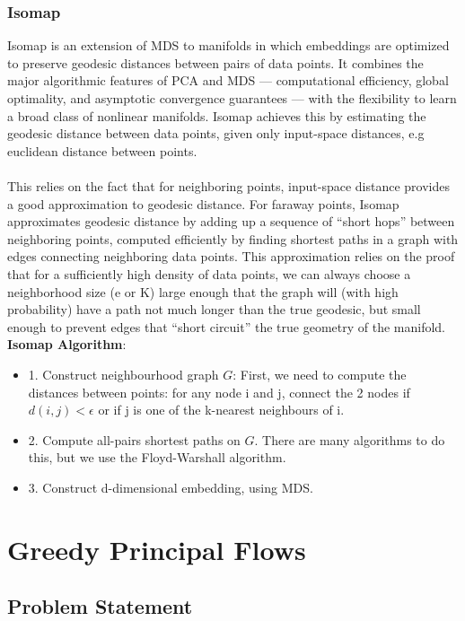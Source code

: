 \documentclass[12pt]{report}
\begin{document}
\newpage

\subsection{Isomap}

Isomap is an extension of MDS to manifolds in which embeddings 
are optimized to preserve geodesic distances between pairs of data points.
It combines the major algorithmic features of PCA and MDS
 — computational efficiency, global optimality, 
 and asymptotic convergence guarantees — 
 with the flexibility to learn a broad class of nonlinear manifolds.
 Isomap achieves this by estimating the geodesic distance between data points, 
 given only input-space distances, e.g euclidean distance between points.\\
\\
This relies on the fact that for neighboring points, 
input-space distance provides a good approximation to geodesic distance. 
For faraway points, Isomap approximates geodesic distance 
by adding up a sequence of “short hops” between neighboring points, 
computed efficiently by finding shortest paths in a graph with edges 
connecting neighboring data points.  
This approximation relies on the proof that for a 
sufficiently high density of data points, 
we can always choose a neighborhood size (e or K) large enough 
that the graph will (with high probability) have a path not much longer 
than the true geodesic, but small enough to prevent edges 
that “short circuit” the true geometry of the manifold.\\
\textbf{Isomap Algorithm}:
\begin{itemize}
    \item 1. Construct neighbourhood graph $G$: 
    First, we need to compute the distances between points: 
    for any node i and j, connect the 2 nodes if 
    $d(i,j) < \epsilon$ or if j is one of the k-nearest neighbours of i.
    \item 2. Compute all-pairs shortest paths on $G$. 
    There are many algorithms to do this, but we use the Floyd-Warshall algorithm.
    \item 3. Construct d-dimensional embedding, using MDS.
\end{itemize}

\chapter{Greedy Principal Flows}

\section{Problem Statement}
\end{document}
